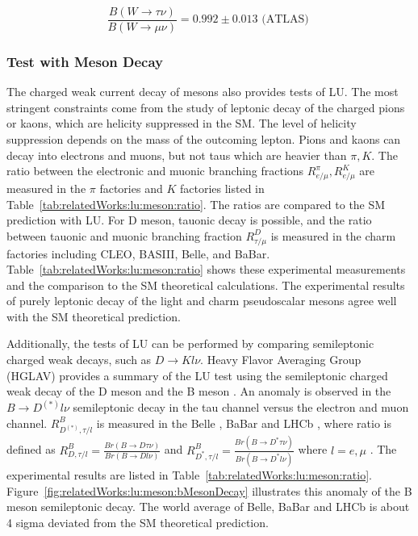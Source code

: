 $$ \frac{ B(W  \to \tau \nu) }{ B(W \to \mu \nu)}  = 0.992 \pm 0.013 \text{ (ATLAS) }$$





\subsubsection{Test with Meson Decay}
\label{sec:relatedWorks:lu:meson}



The charged weak current decay of mesons also provides tests of LU.  The most stringent constraints come from the study of leptonic decay of the charged pions or kaons, which are helicity suppressed in the SM.  The level of helicity suppression depends on the mass of the outcoming lepton. Pions and kaons can decay into electrons and muons, but not taus which are heavier than $\pi, K$. The ratio between the electronic and muonic branching fractions $R^\pi_{e/\mu},R^K_{e/\mu}$ are measured in the $\pi$ factories \cite{Numao:1992ve, Britton:1992pg, Aguilar-Arevalo:2015cdf, Czapek:1993kc} and $K$ factories \cite{Lazzeroni:2012cx, Ambrosino:2009aa} listed in Table~\ref{tab:relatedWorks:lu:meson:ratio}. The ratios are compared to the SM prediction with LU. For D meson, tauonic decay is possible, and the ratio between tauonic and muonic branching fraction $R^D_{\tau/\mu}$ is measured in the charm factories including CLEO, BASIII, Belle, and BaBar. Table~\ref{tab:relatedWorks:lu:meson:ratio} shows these experimental measurements and the comparison to the SM theoretical calculations. The experimental results of purely leptonic decay of the light and charm pseudoscalar mesons agree well with the SM theoretical prediction. 

Additionally, the tests of LU can be performed by comparing semileptonic charged weak decays, such as $D\to K l\nu$. Heavy Flavor Averaging Group (HGLAV) provides a summary of the LU test using the semileptonic charged weak decay of the D meson and the B meson \cite{Amhis:2019ckw}. An anomaly is observed in the $B\to D^{(*)} l\nu$ semileptonic decay in the tau channel versus the electron and muon channel. $R^{B}_{D^{(*)}, \tau/l}$ is measured in the Belle \cite{Huschle:2015rga, Sato:2016svk, Hirose:2016wfn}, BaBar  \cite{Lees:2012xj, Lees:2013uzd} and LHCb \cite{Aaij:2015yra,Aaij:2017uff, Aaij:2017deq}, where ratio is defined as $R^{B}_{D, \tau/l} = \frac{Br(B\to D\tau \nu)}{Br(B\to Dl \nu)}$ and $R^{B}_{D^*, \tau/l} = \frac{Br(B\to D^*\tau \nu)}{Br(B\to D^*l \nu)}$ where $l=e,\mu$ . The experimental results are listed in Table~\ref{tab:relatedWorks:lu:meson:ratio}. Figure~\ref{fig:relatedWorks:lu:meson:bMesonDecay} illustrates this anomaly of the B meson semileptonic decay. The world average of Belle, BaBar and LHCb is about 4 sigma deviated from the SM theoretical prediction.

